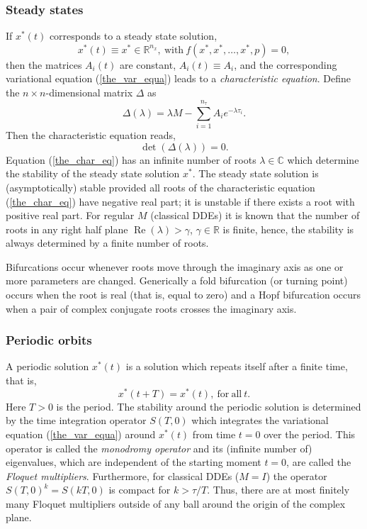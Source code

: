 \documentclass[10pt]{scrartcl}
\newcommand{\define}[1]{\emph{#1}}
\newcommand{\RR}{\mathbb{R}}
\newcommand{\CC}{\mathbb{C}}
\renewcommand{\Re}{\operatorname{Re}}
\begin{document}
\subsubsection{Steady states}
\label{sec:dde:stst}
If $x^*(t)$ corresponds to a steady state solution,
\[
x^*(t)\equiv x^*\in\RR^{n_x},\mathrm{\ with\ }f(x^*,x^*,\ldots,x^*,p)=0,
\]
then the matrices 
$A_i(t)$ are constant, $A_i(t)\equiv A_i$, and the corresponding 
variational equation (\ref{the_var_equa})
leads to a \define{characteristic equation}. Define the $n\times n$-dimensional
matrix $\Delta$ as
\begin{equation}
  \Delta(\lambda)=\lambda M - \sum_{i=1}^{n_\tau} A_i e^{-\lambda\tau_i}.
\label{eq:deltadef}
\end{equation}
Then the characteristic equation reads,
\begin{equation}\label{the_char_eq}
\det(\Delta(\lambda))=0.
\end{equation}
Equation (\ref{the_char_eq}) has an infinite number of roots
$\lambda\in\CC$ which determine the stability of the steady state
solution $x^*$.  The steady state solution is (asymptotically) stable
provided all roots of the characteristic equation (\ref{the_char_eq})
have negative real part; it is unstable if there exists a root with
positive real part. For regular $M$ (classical DDEs) it is known that
the number of roots in any right half plane $\Re(\lambda)>\gamma$,
$\gamma\in\RR$ is finite, hence, the stability is always determined by
a finite number of roots.

Bifurcations occur whenever roots move through the imaginary
axis as one or more parameters are changed.
Generically a fold bifurcation (or turning point) occurs when
the root is real (that is, equal to zero) and a 
Hopf bifurcation occurs when a pair of complex conjugate roots crosses the imaginary axis.

\subsubsection{Periodic orbits}
\label{sec:dde:psol}
A periodic solution $x^*(t)$ is a solution which repeats itself after
a finite time, that is,
\[ 
x^*(t+T)=x^*(t),\mathrm{\ for\ all\ }t. 
\]
Here $T>0$ is the period.  The stability around the periodic solution
is determined by the time integration operator $S(T,0)$ which
integrates the variational equation (\ref{the_var_equa}) around
$x^*(t)$ from time $t=0$ over the period.  This operator is called the
\define{monodromy operator} and its (infinite number of) eigenvalues,
which are independent of the starting moment $t=0$, are called the
\define{Floquet multipliers}.  Furthermore, for classical DDEs ($M=I$) the operator
$S(T,0)^k=S(kT,0)$ is compact for $k>\tau/T$. Thus, there are at most finitely
many Floquet multipliers outside of any ball around the origin of the
complex plane.
\end{document}
